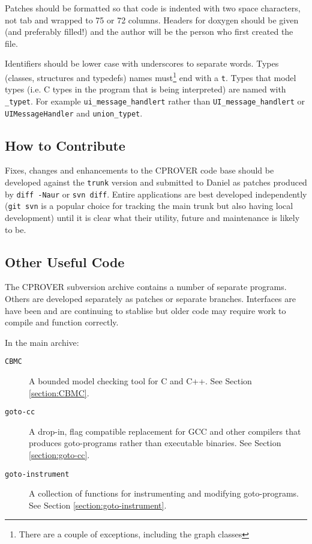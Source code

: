 \documentclass{article}
\newcommand{\code}[1]{\texttt{#1}}
\newcommand{\prog}[1]{\texttt{#1}}
\begin{document}
Patches should be formatted so that code is indented with two space
characters, not tab and wrapped to 75 or 72 columns.  Headers for
doxygen should be given (and preferably filled!) and the author will
be the person who first created the file.

Identifiers should be lower case with underscores to separate words.
Types (classes, structures and typedefs) names must\footnote{There are
a couple of exceptions, including the graph classes} end with a
\code{t}.  Types that model types (i.e. C types in the program that is
being interpreted) are named with \code{\_typet}.
For example \code{ui\_message\_handlert} rather than
\code{UI\_message\_handlert} or \code{UIMessageHandler} and
\code{union\_typet}.



\subsection{How to Contribute}

Fixes, changes and enhancements to the CPROVER code base should be
developed against the \texttt{trunk} version and submitted to Daniel
as patches produced by \texttt{diff -Naur} or \texttt{svn diff}.
Entire applications are best developed independently (\texttt{git svn}
is a popular choice for tracking the main trunk but also having local
development) until it is clear what their utility, future and
maintenance is likely to be.


\subsection{Other Useful Code}
\label{section:other-apps}

The CPROVER subversion archive contains a number of separate
programs.  Others are developed separately as patches or separate
branches.%
Interfaces are have been and are continuing to stablise but older code
may require work to compile and function correctly.

In the main archive:

\begin{description}
  \item[\prog{CBMC}]{A bounded model checking tool for C and C++. See
    Section \ref{section:CBMC}.}
  \item[\prog{goto-cc}]{A drop-in, flag compatible replacement for GCC
    and other compilers that produces goto-programs rather than
    executable binaries.  See Section \ref{section:goto-cc}.}
  \item[\prog{goto-instrument}]{A collection of functions for
    instrumenting and modifying goto-programs.  See Section
    \ref{section:goto-instrument}.}
\end{description}
\end{document}
